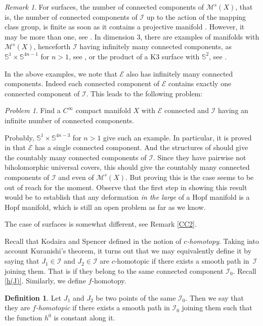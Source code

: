 \documentclass[JEP,XML,SOM,Unicode]{cedram}
\let\mathcal\mathscr
\theoremstyle{plain}
\theoremstyle{definition}
\newtheorem{definition}[theorem]{Definition}
\theoremstyle{remark}
\newtheorem{remark}[theorem]{Remark}
\newtheorem{problem}[theorem]{Problem}
\numberwithin{equation}{section}
\newcommand{\cI}{\mathcal{I}}
\begin{document}
\begin{remark}
\label{countableexamples}
For surfaces, the number of connected components of $\mathcal M^s(X)$, that is, the number of connected components of $\cI$ up to the action of the mapping class group, is finite as soon as it contains a projective manifold \cite{FM}. However, it may be more than one, see \cite{Cat2}.
In dimension $3$, there are examples of manifolds with $\mathcal M^s(X)$, henceforth $\cI$ having infinitely many connected components, as $\mathbb S^1\times\mathbb S^{4n-1}$ for $n>1$, see \cite{Morita}, or the product of a K3 surface with $\mathbb S^2$, see \cite{LeBrun}.

In the above examples, we note that $\mathcal E$ also has infinitely many connected components. Indeed each connected component of $\mathcal E$ contains exactly one connected component of $\cI$. This leads to the following problem:
\begin{problem}
\label{ccpb}
Find a $C^\infty$ compact manifold $X$ with $\mathcal E$ connected and $\cI$ having an infinite number of connected components.
\end{problem}

Probably, $\mathbb S^1\times\mathbb S^{4n-3}$ for $n>1$ give such an example. In particular, it is proved in \cite{Morita} that $\mathcal E$ has a single connected component. And the structures of \cite{BVdV} should give the countably many connected components of $\cI$. Since they have pairwise not biholomorphic universal covers, this should give the countably many connected components of $\cI$ and even of $\mathcal M^s(X)$. But proving this is the case seems to be out of reach for the moment. Observe that the first step in showing this result would be to establish that any deformation \emph{in the large} of a Hopf manifold is a Hopf manifold, which is still an open problem as far as we know.

The case of surfaces is somewhat different, see Remark \ref{CC2}.
\end{remark}

Recall that Kodaira and Spencer defined in \cite{K-S1} the notion of \emph{$c$-homotopy}. Taking into account Kuranishi's theorem, it turns out that we may equivalently define it by saying that $J_1\in\cI$ and $J_2\in\cI$ are $c$-homotopic if there exists a smooth path in~$\cI$ joining them. That is if they belong to the same connected component $\cI_0$. Recall \eqref{h(J)}. Similarly, we define $f$-homotopy.

\begin{definition}
Let $J_1$ and $J_2$ be two points of the same $\cI_0$. Then we say that they are \emph{$f$-homotopic} if there exists a smooth path in $\cI_0$ joining them such that the function $h^0$ is constant along it.
\end{definition}
\end{document}
